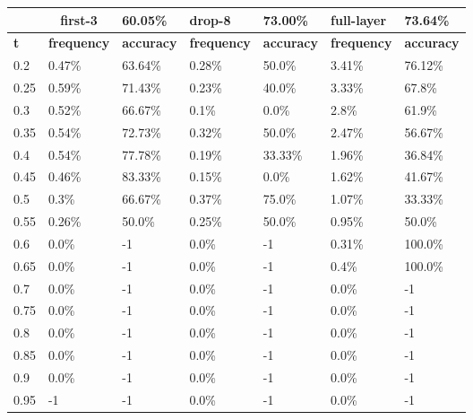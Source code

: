 
\begin{table}[t]
\centering
\begin{tabular}{lllllll}
\hline
\multicolumn{1}{c}{} & \multicolumn{1}{c}{first-3} & \multicolumn{1}{l|}{60.05\%} & drop-8 & \multicolumn{1}{l|}{73.00\%} & full-layer & 73.64\% \\ \hline
\multicolumn{1}{l|}{\textbf{t}} & \textbf{frequency} & \multicolumn{1}{l|}{\textbf{accuracy}} & \textbf{frequency} & \multicolumn{1}{l|}{\textbf{accuracy}} & \textbf{frequency} & \textbf{accuracy} \\ \hline	\multicolumn{1}{l|}{0.2}&  0.47\% & \multicolumn{1}{l|}{63.64\%}& 0.28\% & \multicolumn{1}{l|}{50.0\%}& 3.41\% & 76.12\%\\ 
\multicolumn{1}{l|}{0.25}&  0.59\% & \multicolumn{1}{l|}{71.43\%}& 0.23\% & \multicolumn{1}{l|}{40.0\%}& 3.33\% & 67.8\%\\ 
\multicolumn{1}{l|}{0.3}&  0.52\% & \multicolumn{1}{l|}{66.67\%}& 0.1\% & \multicolumn{1}{l|}{0.0\%}& 2.8\% & 61.9\%\\ 
\multicolumn{1}{l|}{0.35}&  0.54\% & \multicolumn{1}{l|}{72.73\%}& 0.32\% & \multicolumn{1}{l|}{50.0\%}& 2.47\% & 56.67\%\\ 
\multicolumn{1}{l|}{0.4}&  0.54\% & \multicolumn{1}{l|}{77.78\%}& 0.19\% & \multicolumn{1}{l|}{33.33\%}& 1.96\% & 36.84\%\\ 
\multicolumn{1}{l|}{0.45}&  0.46\% & \multicolumn{1}{l|}{83.33\%}& 0.15\% & \multicolumn{1}{l|}{0.0\%}& 1.62\% & 41.67\%\\ 
\multicolumn{1}{l|}{0.5}&  0.3\% & \multicolumn{1}{l|}{66.67\%}& 0.37\% & \multicolumn{1}{l|}{75.0\%}& 1.07\% & 33.33\%\\ 
\multicolumn{1}{l|}{0.55}&  0.26\% & \multicolumn{1}{l|}{50.0\%}& 0.25\% & \multicolumn{1}{l|}{50.0\%}& 0.95\% & 50.0\%\\ 
\multicolumn{1}{l|}{0.6}&  0.0\% & \multicolumn{1}{l|}{-1}& 0.0\% & \multicolumn{1}{l|}{-1}& 0.31\% & 100.0\%\\ 
\multicolumn{1}{l|}{0.65}&  0.0\% & \multicolumn{1}{l|}{-1}& 0.0\% & \multicolumn{1}{l|}{-1}& 0.4\% & 100.0\%\\ 
\multicolumn{1}{l|}{0.7}&  0.0\% & \multicolumn{1}{l|}{-1}& 0.0\% & \multicolumn{1}{l|}{-1}& 0.0\% & -1\\ 
\multicolumn{1}{l|}{0.75}&  0.0\% & \multicolumn{1}{l|}{-1}& 0.0\% & \multicolumn{1}{l|}{-1}& 0.0\% & -1\\ 
\multicolumn{1}{l|}{0.8}&  0.0\% & \multicolumn{1}{l|}{-1}& 0.0\% & \multicolumn{1}{l|}{-1}& 0.0\% & -1\\ 
\multicolumn{1}{l|}{0.85}&  0.0\% & \multicolumn{1}{l|}{-1}& 0.0\% & \multicolumn{1}{l|}{-1}& 0.0\% & -1\\ 
\multicolumn{1}{l|}{0.9}&  0.0\% & \multicolumn{1}{l|}{-1}& 0.0\% & \multicolumn{1}{l|}{-1}& 0.0\% & -1\\ 
\multicolumn{1}{l|}{0.95}&  -1 & \multicolumn{1}{l|}{-1}& 0.0\% & \multicolumn{1}{l|}{-1}& 0.0\% & -1\\ 


\end{tabular}
\end{table}
